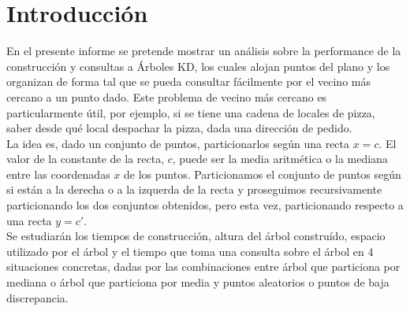 \documentclass[12pt,letterpaper, margin = 3cm]{article}
\begin{document}

\tableofcontents

\newpage
\section{Introducción}

En el presente informe se pretende mostrar un análisis sobre la performance de la construcción y consultas a Árboles KD, los cuales alojan puntos del plano y los organizan de forma tal que se pueda consultar fácilmente por el vecino más cercano a un punto dado.
Este problema de vecino más cercano es particularmente útil, por ejemplo, si se tiene una cadena de locales de pizza, saber desde qué local despachar la pizza, dada una dirección de pedido.\\
La idea es, dado un conjunto de puntos, particionarlos según una recta  $x=c$. El valor de la constante de la recta, $c$, puede ser la media aritmética o la mediana entre las coordenadas $x$ de los puntos. Particionamos el conjunto de puntos según si están a la derecha o a la izquerda de la recta y proseguimos recursivamente particionando los dos conjuntos obtenidos, pero esta vez, particionando respecto a una recta $y=c'$.\\
Se estudiarán los tiempos de construcción, altura del árbol construído, espacio utilizado por el árbol y el tiempo que toma una consulta sobre el árbol en 4 situaciones concretas, dadas por las combinaciones entre árbol que particiona por mediana o árbol que particiona por media y puntos aleatorios o puntos de baja discrepancia.
\end{document}
